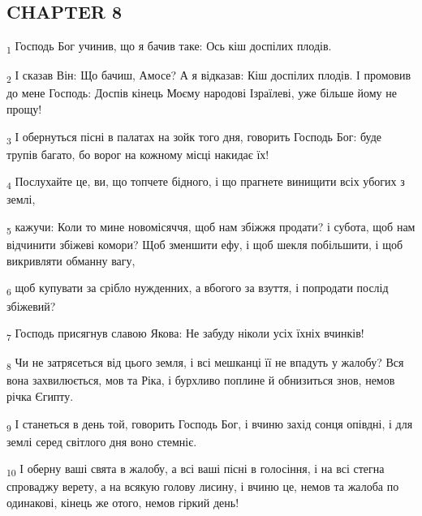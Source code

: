 \subsection{CHAPTER 8}
\begin{tcolorbox}
\textsubscript{1} Господь Бог учинив, що я бачив таке: Ось кіш доспілих плодів.
\end{tcolorbox}
\begin{tcolorbox}
\textsubscript{2} І сказав Він: Що бачиш, Амосе? А я відказав: Кіш доспілих плодів. І промовив до мене Господь: Доспів кінець Моєму народові Ізраїлеві, уже більше йому не прощу!
\end{tcolorbox}
\begin{tcolorbox}
\textsubscript{3} І обернуться пісні в палатах на зойк того дня, говорить Господь Бог: буде трупів багато, бо ворог на кожному місці накидає їх!
\end{tcolorbox}
\begin{tcolorbox}
\textsubscript{4} Послухайте це, ви, що топчете бідного, і що прагнете винищити всіх убогих з землі,
\end{tcolorbox}
\begin{tcolorbox}
\textsubscript{5} кажучи: Коли то мине новомісяччя, щоб нам збіжжя продати? і субота, щоб нам відчинити збіжеві комори? Щоб зменшити ефу, і щоб шекля побільшити, і щоб викривляти обманну вагу,
\end{tcolorbox}
\begin{tcolorbox}
\textsubscript{6} щоб купувати за срібло нужденних, а вбогого за взуття, і попродати послід збіжевий?
\end{tcolorbox}
\begin{tcolorbox}
\textsubscript{7} Господь присягнув славою Якова: Не забуду ніколи усіх їхніх вчинків!
\end{tcolorbox}
\begin{tcolorbox}
\textsubscript{8} Чи не затрясеться від цього земля, і всі мешканці її не впадуть у жалобу? Вся вона захвилюється, мов та Ріка, і бурхливо поплине й обнизиться знов, немов річка Єгипту.
\end{tcolorbox}
\begin{tcolorbox}
\textsubscript{9} І станеться в день той, говорить Господь Бог, і вчиню захід сонця опівдні, і для землі серед світлого дня воно стемніє.
\end{tcolorbox}
\begin{tcolorbox}
\textsubscript{10} І оберну ваші свята в жалобу, а всі ваші пісні в голосіння, і на всі стегна спроваджу верету, а на всякую голову лисину, і вчиню це, немов та жалоба по одинакові, кінець же отого, немов гіркий день!
\end{tcolorbox}
